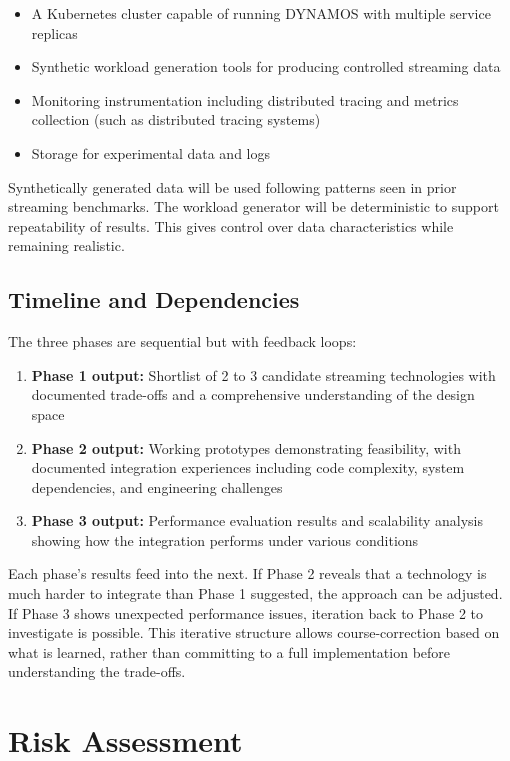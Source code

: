 \documentclass[a4paper,10pt,british]{scrartcl}
\begin{document}
\begin{itemize}
  \item A Kubernetes cluster capable of running DYNAMOS with multiple service replicas
  \item Synthetic workload generation tools for producing controlled streaming data
  \item Monitoring instrumentation including distributed tracing and metrics collection (such as distributed tracing systems)
  \item Storage for experimental data and logs
\end{itemize}

Synthetically generated data will be used following patterns seen in prior streaming benchmarks. The workload generator will be deterministic to support repeatability of results. This gives control over data characteristics while remaining realistic.

\subsection{Timeline and Dependencies}

The three phases are sequential but with feedback loops:

\begin{enumerate}
  \item \textbf{Phase 1 output:} Shortlist of 2 to 3 candidate streaming technologies with documented trade-offs and a comprehensive understanding of the design space
  \item \textbf{Phase 2 output:} Working prototypes demonstrating feasibility, with documented integration experiences including code complexity, system dependencies, and engineering challenges
  \item \textbf{Phase 3 output:} Performance evaluation results and scalability analysis showing how the integration performs under various conditions
\end{enumerate}

Each phase's results feed into the next. If Phase 2 reveals that a technology is much harder to integrate than Phase 1 suggested, the approach can be adjusted. If Phase 3 shows unexpected performance issues, iteration back to Phase 2 to investigate is possible. This iterative structure allows course-correction based on what is learned, rather than committing to a full implementation before understanding the trade-offs.

\section{Risk Assessment}
\end{document}
